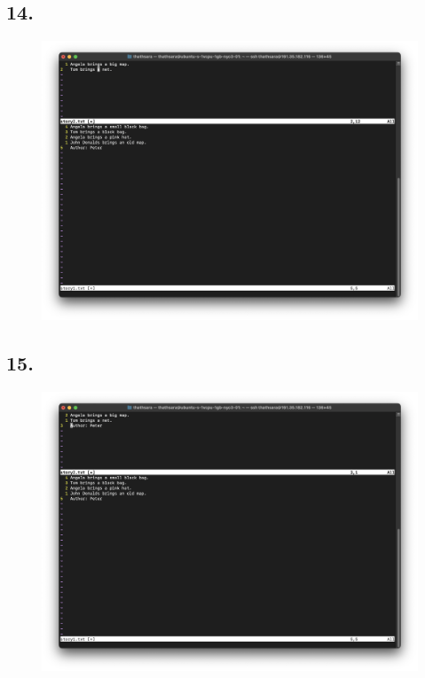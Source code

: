 \documentclass{article}
\begin{document}
    \subsection*{14.}
    \begin{figure}[H]
        \centering
        \includegraphics[width=\textwidth]{2/14.png}
    \end{figure}

    \subsection*{15.}
    \begin{figure}[H]
        \centering
        \includegraphics[width=\textwidth]{2/15.png}
    \end{figure}
\end{document}
